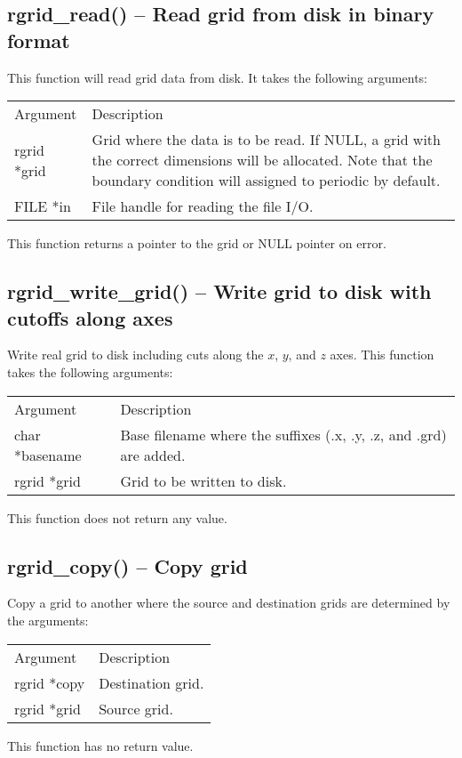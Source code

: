 \documentclass[12pt,letterpaper]{report}
\begin{document}
\subsection{rgrid\_read() -- Read grid from disk in binary format}

This function will read grid data from disk. It takes the following arguments:
\begin{longtable}{p{} p{}}
Argument & Description\\
\cline{1-2}
rgrid *grid & Grid where the data is to be read. If NULL, a grid with the correct dimensions will be allocated. Note that the boundary condition will assigned to periodic by default.\\
FILE *in & File handle for reading the file I/O.\\
\end{longtable}
This function returns a pointer to the grid or NULL pointer on error.

\subsection{rgrid\_write\_grid() -- Write grid to disk with cutoffs along axes}

Write real grid to disk including cuts along the $x$, $y$, and $z$ axes. This function takes the following arguments:
\begin{longtable}{p{} p{}}
Argument & Description\\
\cline{1-2}
char *basename & Base filename where the suffixes (.x, .y, .z, and .grd) are added.\\
rgrid *grid & Grid to be written to disk.\\
\end{longtable}
\noindent
This function does not return any value.

\subsection{rgrid\_copy() -- Copy grid}

Copy a grid to another where the source and destination grids are determined by the arguments:
\begin{longtable}{p{} p{}}
Argument & Description\\
\cline{1-2}
rgrid *copy & Destination grid.\\
rgrid *grid & Source grid.\\
\end{longtable}
\noindent
This function has no return value.
\end{document}
